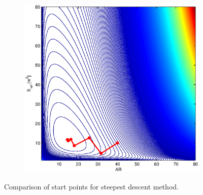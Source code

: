 \documentclass[12pt,parskip=full]{article}
\numberwithin{subsection}{section}
\begin{document}
\begin{figure}[!ht]
\begin{subfigure}[h]{0.3\textwidth}
			\end{subfigure}
			\begin{subfigure}[h]{0.3\textwidth}
				\includegraphics[width=\textwidth]{SteepestDrag3.eps}
			\end{subfigure}
			\caption{Comparison of start points for steepest descent method.\label{fig:steepest}}
		\end{figure}
		
\end{document}
